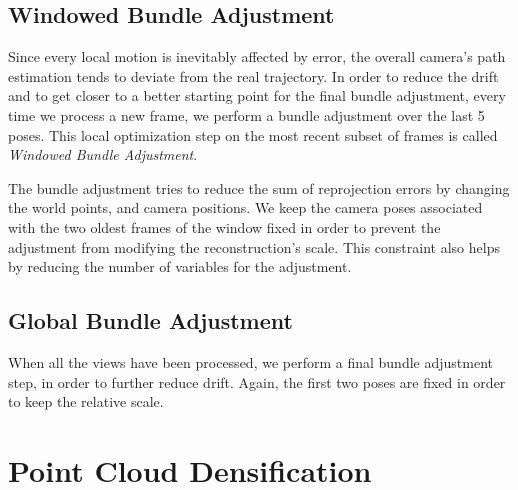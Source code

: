 \subsection{Windowed Bundle Adjustment}
Since every local motion is inevitably affected by error, the overall 
camera's path estimation tends to deviate from the real trajectory.
In order to reduce the drift and to get closer to a better starting point 
for the final bundle adjustment, every time we process a new frame, 
we perform a bundle adjustment over the last 5 poses.
This local optimization step on the most recent subset of frames is called
\textit{Windowed Bundle Adjustment}.

The bundle adjustment tries to reduce the sum of reprojection errors by changing the
world points, and camera positions. 
We keep the camera poses associated with the two oldest frames of the window 
fixed in order to prevent the adjustment from modifying the reconstruction's 
scale. This constraint also helps by reducing the number of variables for the 
adjustment.

\subsection{Global Bundle Adjustment}
When all the views have been processed, we perform a final bundle adjustment 
step, in order to further reduce drift. Again, the first two poses are fixed in 
order to keep the relative scale.

\section{Point Cloud Densification}
\label{sec:pipeline_densification}
